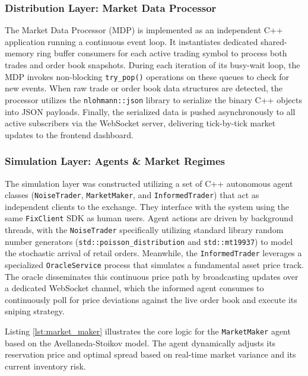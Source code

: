 \documentclass[12pt,a4paper]{article}
\begin{document}
\subsubsection{Distribution Layer: Market Data Processor}
The Market Data Processor (MDP) is implemented as an independent C++ application running a continuous event loop. It instantiates dedicated shared-memory ring buffer consumers for each active trading symbol to process both trades and order book snapshots. During each iteration of its busy-wait loop, the MDP invokes non-blocking \texttt{try\_pop()} operations on these queues to check for new events. When raw trade or order book data structures are detected, the processor utilizes the \texttt{nlohmann::json} library to serialize the binary C++ objects into JSON payloads. Finally, the serialized data is pushed asynchronously to all active subscribers via the WebSocket server, delivering tick-by-tick market updates to the frontend dashboard.

\subsubsection{Simulation Layer: Agents \& Market Regimes}
The simulation layer was constructed utilizing a set of C++ autonomous agent classes (\texttt{NoiseTrader}, \texttt{MarketMaker}, and \texttt{InformedTrader}) that act as independent clients to the exchange. They interface with the system using the same \texttt{FixClient} SDK as human users. Agent actions are driven by background threads, with the \texttt{NoiseTrader} specifically utilizing standard library random number generators (\texttt{std::poisson\_distribution} and \texttt{std::mt19937}) to model the stochastic arrival of retail orders. Meanwhile, the \texttt{InformedTrader} leverages a specialized \texttt{OracleService} process that simulates a fundamental asset price track. The oracle disseminates this continuous price path by broadcasting updates over a dedicated WebSocket channel, which the informed agent consumes to continuously poll for price deviations against the live order book and execute its sniping strategy.

Listing \ref{lst:market_maker} illustrates the core logic for the \texttt{MarketMaker} agent based on the Avellaneda-Stoikov model. The agent dynamically adjusts its reservation price and optimal spread based on real-time market variance and its current inventory risk.
\end{document}
